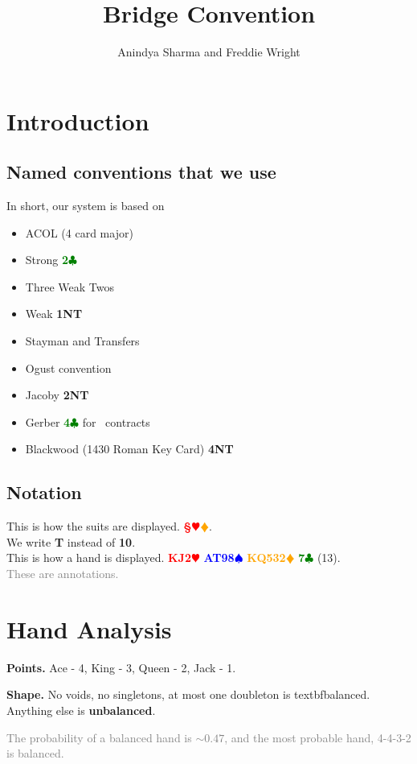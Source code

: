 \documentclass{article}
\title{Bridge Convention}
\author{Anindya Sharma and Freddie Wright}
\date{}
\newcommand{\Hs}{\textcolor{Red}{$\varheartsuit$}}
\newcommand{\Ss}{\textcolor{Blue}{$\spadesuit$}}
\newcommand{\Ds}{\textcolor{Orange}{$\vardiamondsuit$}}
\newcommand{\Cs}{\textcolor{Green}{$\clubsuit$}}
\newcommand{\NTs}{\textbf{\footnotesize{NT}}}
\renewcommand{\H}[1]{\textcolor{Red}{\textbf{#1}\Hs}}
\renewcommand{\S}[1]{\textcolor{Blue}{\textbf{#1}\Ss}}
\newcommand{\D}[1]{\textcolor{Orange}{\textbf{#1}\Ds}}
\newcommand{\C}[1]{\textcolor{Green}{\textbf{#1}\Cs}}
\newcommand{\NT}[1]{\textbf{#1\NTs}}
\newcommand{\note}[1]{\textcolor{gray}{#1}}
\begin{document}
\maketitle

\section{Introduction}

\subsection{Named conventions that we use}
In short, our system is based on
\begin{itemize}
    \item ACOL (4 card major)
    \item Strong \C{2}
    \item Three Weak Twos
    \item Weak \NT{1}
    \item Stayman and Transfers
    \item Ogust convention
    \item Jacoby \NT{2}
    \item Gerber \C{4} for \NT~contracts
    \item Blackwood (1430 Roman Key Card) \NT{4}
\end{itemize}

\subsection{Notation}
This is how the suits are displayed. \H \S \D \C.\\
We write \textbf{T} instead of \textbf{10}.\\
This is how a hand is displayed. \H{KJ2} \S{AT98} \D{KQ532} \C{7} (13).\\
\note{These are annotations.}

\section{Hand Analysis}

\textbf{Points.} Ace - 4, King - 3, Queen - 2, Jack - 1.

\textbf{Shape.} No voids, no singletons, at most one doubleton is textbf{balanced}. Anything else is \textbf{unbalanced}.

\note{The probability of a balanced hand is $\sim 0.47$, and the most probable hand, 4-4-3-2 is balanced.}
\end{document}
